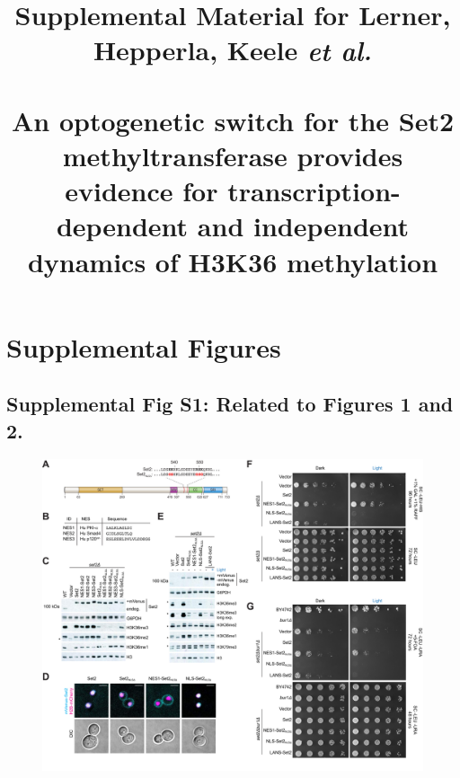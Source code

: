 \documentclass[11pt]{biorxiv}
\title{Supplemental Material for Lerner, Hepperla, Keele \emph{et al.} \\~\\ An optogenetic switch for the Set2 methyltransferase provides evidence for transcription-dependent and independent dynamics of H3K36 methylation}
\author[1]{ }
\begin{document}
\maketitle
\author{}
\thispagestyle{empty}
\tableofcontents

\newpage

\setcounter{page}{1}

\section{Supplemental Figures}
\subsection{Supplemental Fig S1: Related to Figures 1 and 2.}
\begin{figure}[ht!]
\center
\includegraphics[width=\textwidth, trim={0in 0in 0in 0in}, clip]{figures/Supplemental_Fig_S1_compressed.pdf}
\end{figure}
\end{document}
